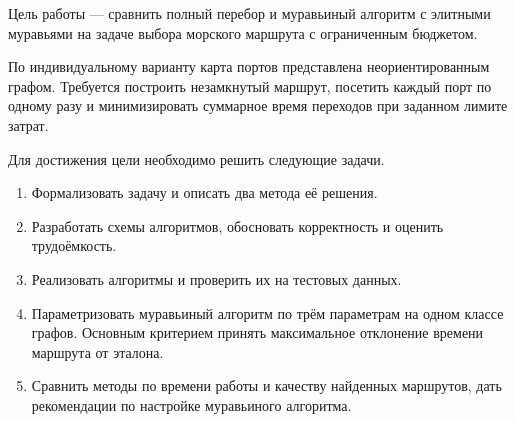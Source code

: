 
Цель работы --- сравнить полный перебор и муравьиный алгоритм с элитными муравьями на задаче выбора морского маршрута с ограниченным бюджетом.

По индивидуальному варианту карта портов представлена неориентированным графом. Требуется построить незамкнутый маршрут, посетить каждый порт по одному разу и минимизировать суммарное время переходов при заданном лимите затрат.

Для достижения цели необходимо решить следующие задачи.
\begin{enumerate}
\item Формализовать задачу и описать два метода её решения.
\item Разработать схемы алгоритмов, обосновать корректность и оценить трудоёмкость.
\item Реализовать алгоритмы и проверить их на тестовых данных.
\item Параметризовать муравьиный алгоритм по трём параметрам на одном классе графов. Основным критерием принять максимальное отклонение времени маршрута от эталона.
\item Сравнить методы по времени работы и качеству найденных маршрутов, дать рекомендации по настройке муравьиного алгоритма.
\end{enumerate}

